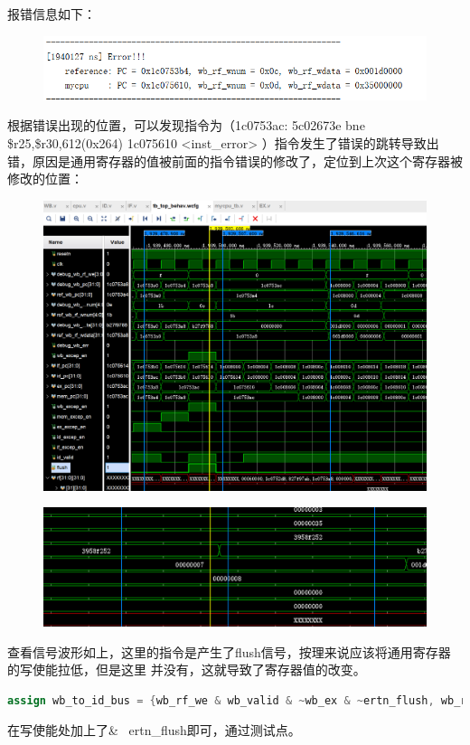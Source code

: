 \documentclass[11pt]{article}
\begin{document}
          报错信息如下：
          \begin{figure}[H]
            \centering
            \includegraphics[width=15cm]{fig/21.png}
          \end{figure}
          根据错误出现的位置，可以发现指令为（1c0753ac:	5c02673e 	bne	\$r25,\$r30,612(0x264) 1c075610 <inst_error>
          ）指令发生了错误的跳转导致出错，原因是通用寄存器的值被前面的指令错误的修改了，定位到上次这个寄存器被修改的位置：

          \begin{figure}[H]
            \centering
            \includegraphics[width=15cm]{fig/22.png}
          \end{figure}
          \begin{figure}[H]
            \centering
            \includegraphics[width=15cm]{fig/23.png}
          \end{figure}
          查看信号波形如上，这里的指令是产生了flush信号，按理来说应该将通用寄存器的写使能拉低，但是这里
          并没有，这就导致了寄存器值的改变。
           \begin{lstlisting}[language=verilog]
            assign wb_to_id_bus = {wb_rf_we & wb_valid & ~wb_ex & ~ertn_flush, wb_rf_waddr, final_rf_wdata};
          \end{lstlisting}
          在写使能处加上了\& ~ertn_flush即可，通过测试点。
\end{document}
